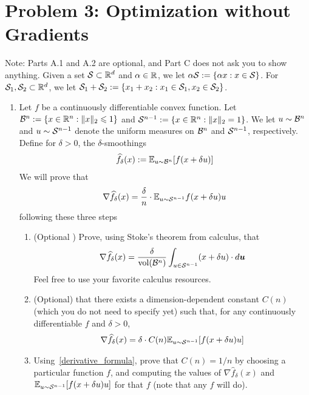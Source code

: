 \documentclass[12pt]{article}
\begin{document}
\section*{Problem 3: Optimization without Gradients} 
	Note: Parts A.1 and A.2 are optional, and Part C does not ask you to show anything. Given a set ${\cal S} \subset \mathbb{R}^d$ and $\alpha \in \mathbb{R}$, we let $\alpha {\cal S} := \{\alpha x: x \in {\cal S}\}$. For ${\cal S}_1,{\cal S}_2 \subset \mathbb{R}^d$, we let ${\cal S}_1 + {\cal S}_2 := \{x_1 + x_2: x_1 \in {\cal S}_1, x_2 \in {\cal S}_2\}$. 
	\begin{enumerate}
		\item Let $f$ be a continuously differentiable convex function. Let ${\cal B}^{n} := \{x \in \mathbb{R}^n: \|x\|_2 \leqslant 1\}$ and ${\cal S}^{n-1} := \{x \in \mathbb{R}^n: \|x\|_2 = 1\}$. We let $u \sim {\cal B}^{n}$ and $u \sim {\cal S}^{n-1}$ denote the uniform measures on ${\cal B}^{n}$ and ${\cal S}^{n-1}$, respectively. Define for $\delta > 0$, the $\delta$-smoothings
		\begin{eqnarray}
		\widehat{f}_{\delta}(x) := \mathbb{E}_{u \sim {\cal B}^{n}}[f(x + \delta u)]
		\end{eqnarray}
		We will prove that
		\begin{eqnarray}
		\nabla \widehat{f}_{\delta}(x) = \frac{\delta}{n} \cdot \mathbb{E}_{u \sim {\cal S}^{n-1}} f(x+ \delta u)u
		\end{eqnarray}
		following these three steps
		\begin{enumerate}
			\item (Optional ) Prove, using Stoke's theorem from calculus, that
			\begin{eqnarray}
			\nabla \widehat{f}_{\delta}(x) = \frac{\delta}{\mathrm{vol}({\cal B}^{n})}\int_{u \in {\cal S}^{n-1}}(x + \delta u)\cdot d{\bm{u}}
			\end{eqnarray}
			Feel free to use your favorite calculus resources.
			\item (Optional)  that there exists a dimension-dependent constant $C(n)$ (which you do not need to specify yet) such that, for any continuously differentiable $f$ and $\delta > 0$,
			\begin{eqnarray}\label{derivative_formula}
			\nabla \widehat{f}_{\delta}(x) = \delta \cdot C(n) \mathbb{E}_{u \sim {\cal S}^{n-1}}[f(x+ \delta u)u]
			\end{eqnarray}
			\item  Using~\eqref{derivative_formula}, prove that $C(n) = 1/n$ by choosing a particular function $f$, and computing the values of $\nabla \widehat{f}_{\delta}(x)$ and $\mathbb{E}_{u \sim {\cal S}^{n-1}}[f(x+ \delta u)u]$ for that $f$ (note that any $f$ will do).
		\end{enumerate}

\end{enumerate}
\end{document}
